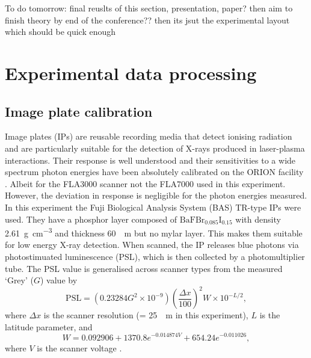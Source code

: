 

To do tomorrow: final reuslts of this section, presentation, paper? then aim to finish theory by end of the conference?? then its jsut the experimental layout which should be quick enough

\section{\label{ch:3-sec:data_processing}Experimental data processing}
\subsection{Image plate calibration}
Image plates (IPs) are reusable recording media that detect ionising radiation and are particularly suitable for the detection of X-rays produced in laser-plasma interactions. Their response is well understood and their sensitivities to a wide spectrum photon energies have been absolutely calibrated on the ORION facility \cite{meadowcroftEvaluationSensitivityFading2008}. Albeit for the FLA3000 scanner not the FLA7000 used in this experiment. However, the deviation in response is negligible for the photon energies measured. In this experiment the Fuji Biological Analysis System (BAS) TR-type IPs were used. They have a phosphor layer composed of $\mathrm{BaFBr_{0.085}I_{0.15}}$ with density \qty{2.61}{g.cm^{-3}} and thickness \qty{60}{\mu m} but no mylar layer. This makes them suitable for low energy X-ray detection. When scanned, the IP releases blue photons via photostimuated luminescence (PSL), which is then collected by a photomultiplier tube. The PSL value is generalised across scanner types from the measured `Grey' ($G$) value by
\begin{equation}
	\mathrm{PSL} = (0.23284G^2\times 10^{-9})\left(\frac{\Delta x}{100}\right)^2W\times 10^{-L/2},
\end{equation}
where $\Delta x$ is the scanner resolution (= \qty{25}{\mu m} in this experiment), $L$ is the latitude parameter, and
\begin{equation}
	W = 0.092906 + 1370.8e^{-0.014874V} +  654.24e^{-0.011026},
\end{equation}
where $V$ is the scanner voltage \cite{golovinCalibrationImagingPlates2021}.

